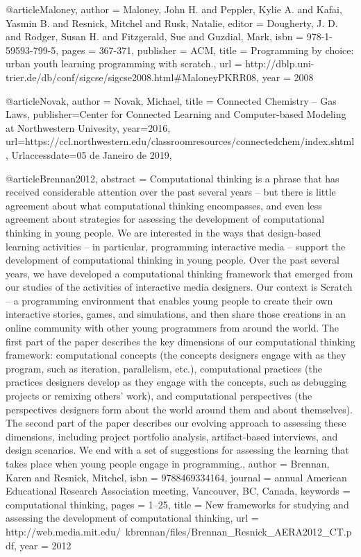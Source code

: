 

@article{Maloney,
  author = {Maloney, John H. and Peppler, Kylie A. and Kafai, Yasmin B. and Resnick, Mitchel and Rusk, Natalie},
  editor = {Dougherty, J. D. and Rodger, Susan H. and Fitzgerald, Sue and Guzdial, Mark},
  isbn = {978-1-59593-799-5},
  pages = {367-371},
  publisher = {ACM},
  title = {Programming by choice: urban youth learning programming with scratch.},
  url = {http://dblp.uni-trier.de/db/conf/sigcse/sigcse2008.html#MaloneyPKRR08},
  year = 2008
}

@article{Novak,
	author = {Novak, Michael}, 
	title = {{Connected Chemistry – Gas Laws}},
	publisher={Center for Connected Learning and Computer-based Modeling at Northwestern Univesity},
	year={2016},
	url={https://ccl.northwestern.edu/classroomresources/connectedchem/index.shtml},
	Urlaccessdate={05 de Janeiro de 2019},
}



@article{Brennan2012,
	abstract = {Computational thinking is a phrase that has received considerable attention over the past several years – but there is little agreement about what computational thinking encompasses, and even less agreement about strategies for assessing the development of computational thinking in young people. We are interested in the ways that design-based learning activities – in particular, programming interactive media – support the development of computational thinking in young people. Over the past several years, we have developed a computational thinking framework that emerged from our studies of the activities of interactive media designers. Our context is Scratch – a programming environment that enables young people to create their own interactive stories, games, and simulations, and then share those creations in an online community with other young programmers from around the world. The first part of the paper describes the key dimensions of our computational thinking framework: computational concepts (the concepts designers engage with as they program, such as iteration, parallelism, etc.), computational practices (the practices designers develop as they engage with the concepts, such as debugging projects or remixing others' work), and computational perspectives (the perspectives designers form about the world around them and about themselves). The second part of the paper describes our evolving approach to assessing these dimensions, including project portfolio analysis, artifact-based interviews, and design scenarios. We end with a set of suggestions for assessing the learning that takes place when young people engage in programming.},
	author = {Brennan, Karen and Resnick, Mitchel},
	isbn = {9788469334164},
	journal = {annual American Educational Research Association meeting, Vancouver, BC, Canada},
	keywords = {computational thinking},
	pages = {1--25},
	title = {{New frameworks for studying and assessing the development of computational thinking}},
	url = {http://web.media.mit.edu/{~}kbrennan/files/Brennan{\_}Resnick{\_}AERA2012{\_}CT.pdf},
	year = {2012}
}


